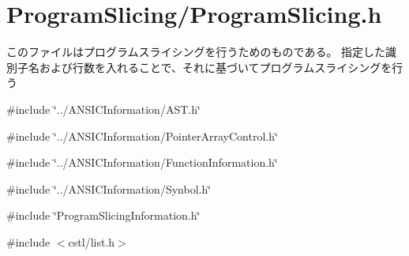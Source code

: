 \section{ProgramSlicing/ProgramSlicing.h}
\label{ProgramSlicing_8h}


このファイルはプログラムスライシングを行うためのものである。 指定した識別子名および行数を入れることで、それに基づいてプログラムスライシングを行う  


{\ttfamily \#include \char`\"{}../ANSICInformation/AST.h\char`\"{}}\par
{\ttfamily \#include \char`\"{}../ANSICInformation/PointerArrayControl.h\char`\"{}}\par
{\ttfamily \#include \char`\"{}../ANSICInformation/FunctionInformation.h\char`\"{}}\par
{\ttfamily \#include \char`\"{}../ANSICInformation/Synbol.h\char`\"{}}\par
{\ttfamily \#include \char`\"{}ProgramSlicingInformation.h\char`\"{}}\par
{\ttfamily \#include $<$cstl/list.h$>$}\par
